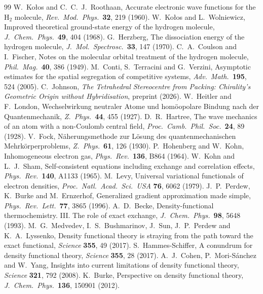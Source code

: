\documentclass[11pt]{article}
\begin{document}
\begin{thebibliography}{99}
 W.\ Ko\l{}os and C.\ C.\ J.\ Roothaan, Accurate electronic wave functions for the
H$_2$ molecule, \emph{Rev.\ Mod.\ Phys.}\ \textbf{32}, 219 (1960).
 W.\ Ko\l{}os and L.\ Wolniewicz, Improved theoretical ground-state energy of the hydrogen
molecule, \emph{J.\ Chem.\ Phys.}\ \textbf{49}, 404 (1968).
 G.\ Herzberg, The dissociation energy of the hydrogen molecule, \emph{J.\ Mol.\
Spectrosc.}\ \textbf{33}, 147 (1970).
 C.\ A.\ Coulson and I.\ Fischer, Notes on the molecular orbital treatment of the
hydrogen molecule, \emph{Phil.\ Mag.}\ \textbf{40}, 386 (1949).
 M.\ Conti, S.\ Terracini and G.\ Verzini, Asymptotic estimates for the spatial
segregation of competitive systems, \emph{Adv.\ Math.}\ \textbf{195}, 524 (2005).
\bibitem{chirality} C.\ Johnson, \emph{The Tetrahedral Stereocentre from Packing: Chirality's Geometric Origin without Hybridisation}, preprint (2026).
\bibitem{hl} W.\ Heitler and F.\ London, Wechselwirkung neutraler Atome und hom\"oopolare Bindung nach der
Quantenmechanik, \emph{Z.\ Phys.}\ \textbf{44}, 455 (1927).
 D.\ R.\ Hartree, The wave mechanics of an atom with a non-Coulomb central field,
\emph{Proc.\ Camb.\ Phil.\ Soc.}\ \textbf{24}, 89 (1928).
 V.\ Fock, N\"aherungsmethode zur L\"osung des quantenmechanischen Mehrk\"orperproblems,
\emph{Z.\ Phys.}\ \textbf{61}, 126 (1930).
 P.\ Hohenberg and W.\ Kohn, Inhomogeneous electron gas, \emph{Phys.\ Rev.}\ \textbf{136}, B864 (1964).
\bibitem{ks} W.\ Kohn and L.\ J.\ Sham, Self-consistent equations including exchange and correlation effects,
\emph{Phys.\ Rev.}\ \textbf{140}, A1133 (1965).
 M.\ Levy, Universal variational functionals of electron densities, \emph{Proc.\ Natl.\ Acad.\ Sci.\ USA}
\textbf{76}, 6062 (1979).
 J.\ P.\ Perdew, K.\ Burke and M.\ Ernzerhof, Generalized gradient approximation made simple,
\emph{Phys.\ Rev.\ Lett.}\ \textbf{77}, 3865 (1996).
 A.\ D.\ Becke, Density-functional thermochemistry. III. The role of exact exchange,
\emph{J.\ Chem.\ Phys.}\ \textbf{98}, 5648 (1993).
 M.\ G.\ Medvedev, I.\ S.\ Bushmarinov, J.\ Sun, J.\ P.\ Perdew and K.\ A.\ Lyssenko, Density
functional theory is straying from the path toward the exact functional, \emph{Science} \textbf{355}, 49 (2017).
\bibitem{hammes} S.\ Hammes-Schiffer, A conundrum for density functional theory, \emph{Science} \textbf{355}, 28 (2017).
\bibitem{cohen} A.\ J.\ Cohen, P.\ Mori-S\'anchez and W.\ Yang, Insights into current limitations of density
functional theory, \emph{Science} \textbf{321}, 792 (2008).
 K.\ Burke, Perspective on density functional theory, \emph{J.\ Chem.\ Phys.}\ \textbf{136}, 150901 (2012).
\end{thebibliography}
\end{document}
